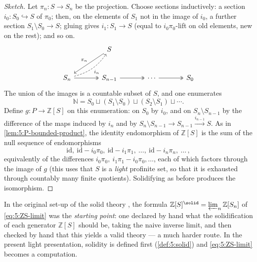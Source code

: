 \begin{proof}[Sketch]
Let $\pi_{n}\colon S\to S_{n}$ be the projection. Choose sections inductively: a
section $i_{0}\colon S_{0}\hookrightarrow S$ of $\pi_0$; then, on the elements of
$S_{1}$ not in the image of $i_{0}$, a further section $S_{1}\setminus S_{0}\to S$;
gluing gives $i_{1}\colon S_{1}\to S$ (equal to $i_0\pi_0$-lift on old elements,
new on the rest); and so on.
\[
\begin{tikzcd}[row sep=large, column sep=large]
& S \arrow[ld, "\pi_n"'] & \\
S_n \arrow[r, two heads] \arrow[ru, bend right=20, dashed, "i_n"'] & S_{n-1} \arrow[r, two heads] & \cdots \arrow[r, two heads] & S_0
\end{tikzcd}
\]
The union of the images is a countable subset of $S$, and one enumerates
\begin{equation*}
\mathbb{N}=S_{0}\sqcup(S_{1}\setminus S_{0})\sqcup(S_{2}\setminus S_{1})\sqcup\cdots .
\end{equation*}
Define $g\colon P\to\mathbb{Z}[S]$ on this enumeration: on $S_{0}$ by $i_{0}$, and
on $S_{n}\setminus S_{n-1}$ by the difference of the maps induced by $i_{n}$ and by
$S_{n}\setminus S_{n-1}\to S_{n-1}\xrightarrow{i_{n-1}}S$. As in
\cref{lem:5:P-bounded-product}, the identity endomorphism of $\mathbb{Z}[S]$ is the
sum of the null sequence of endomorphisms
\begin{equation*}
\mathrm{id},\ \mathrm{id}-i_{0}\pi_{0},\ \mathrm{id}-i_{1}\pi_{1},\ \dots,\
\mathrm{id}-i_{n}\pi_{n},\ \dots\,,
\end{equation*}
equivalently of the differences $i_{0}\pi_{0},\ i_{1}\pi_{1}-i_{0}\pi_{0},\dots$,
each of which factors through the image of $g$ (this uses that $S$ is a
\emph{light} profinite set, so that it is exhausted through countably many finite
quotients). Solidifying as before produces the isomorphism.
\end{proof}

\begin{remark}
\label{rmk:5:was-definition}
In the original set-up of the solid theory
\cite{clausen2019condensed}, the formula $\mathbb{Z}[S]^{\solid}=\varprojlim_{n}
\mathbb{Z}[S_{n}]$ of \eqref{eq:5:ZS-limit} was the \emph{starting point}: one
declared by hand what the solidification of each generator $\mathbb{Z}[S]$ should
be, taking the naive inverse limit, and then checked by hand that this yields a
valid theory --- a much harder route. In the present light presentation, solidity
is defined first (\cref{def:5:solid}) and \eqref{eq:5:ZS-limit} becomes a
computation.
\end{remark}


